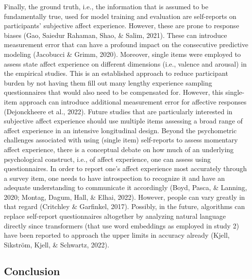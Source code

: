 \documentclass[
  man,floatsintext]{apa6}
\begin{document}
Finally, the ground truth, i.e., the information that is assumed to be fundamentally true, used for model training and evaluation are self-reports on participants' subjective affect experience. However, these are prone to response biases (Gao, Saiedur Rahaman, Shao, \& Salim, 2021). These can introduce measurement error that can have a profound impact on the consecutive predictive modeling (Jacobucci \& Grimm, 2020). Moreover, single items were employed to assess state affect experience on different dimensions (i.e., valence and arousal) in the empirical studies. This is an established approach to reduce participant burden by not having them fill out many lengthy experience sampling questionnaires that would also need to be compensated for. However, this single-item approach can introduce additional measurement error for affective responses (Dejonckheere et al., 2022). Future studies that are particularly interested in subjective affect experience should use multiple items assessing a broad range of affect experience in an intensive longitudinal design. Beyond the psychometric challenges associated with using (single item) self-reports to assess momentary affect experience, there is a conceptual debate on how much of an underlying psychological construct, i.e., of affect experience, one can assess using questionnaires. In order to report one's affect experience most accurately through a survey item, one needs to have introspection to recognize it and have an adequate understanding to communicate it accordingly (Boyd, Pasca, \& Lanning, 2020; Montag, Dagum, Hall, \& Elhai, 2022). However, people can vary greatly in that regard (Critchley \& Garfinkel, 2017). Possibly, in the future, algorithms can replace self-report questionnaires altogether by analyzing natural language directly since transformers (that use word embeddings as employed in study 2) have been reported to approach the upper limits in accuracy already (Kjell, Sikström, Kjell, \& Schwartz, 2022).

\hypertarget{conclusion}{%
\subsection{Conclusion}\label{conclusion}}
\end{document}
